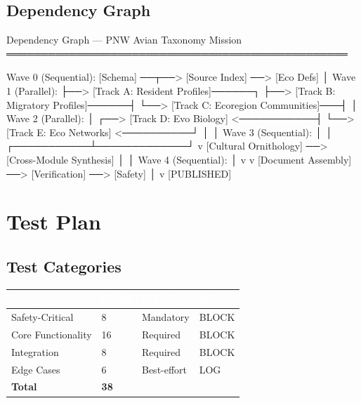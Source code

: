 \documentclass[11pt,letterpaper]{article}
\newcommand{\tableheader}[1]{\textbf{\sffamily\textcolor{white}{#1}}}
\begin{document}
\subsection{Dependency Graph}

\begin{asciibox}
Dependency Graph — PNW Avian Taxonomy Mission
═════════════════════════════════════════════════

Wave 0 (Sequential):
  [Schema] ──┬──> [Source Index] ──> [Eco Defs]
             │
Wave 1 (Parallel):
             ├──> [Track A: Resident Profiles]──────┐
             ├──> [Track B: Migratory Profiles]──────┤
             └──> [Track C: Ecoregion Communities]───┤
                                                     │
Wave 2 (Parallel):                                   │
             ┌──> [Track D: Evo Biology] <───────────┤
             └──> [Track E: Eco Networks] <──────────┘
                         │             │
Wave 3 (Sequential):    │             │
             ┌───────────┴─────────────┘
             v
  [Cultural Ornithology] ──> [Cross-Module Synthesis]
             │                        │
Wave 4 (Sequential):                 │
             v                        v
  [Document Assembly] ──> [Verification] ──> [Safety]
                                              │
                                              v
                                        [PUBLISHED]
\end{asciibox}

\section{Test Plan}

\subsection{Test Categories}

\begin{center}
\begin{tabularx}{\textwidth}{L{3cm}C{1.5cm}C{1.5cm}C{1.5cm}}
\toprule
{}
\tableheader{Category} & \tableheader{Count} & \tableheader{Priority} & \tableheader{Failure} \\
\midrule
Safety-Critical & 8 & Mandatory & BLOCK \\
Core Functionality & 16 & Required & BLOCK \\
Integration & 8 & Required & BLOCK \\
Edge Cases & 6 & Best-effort & LOG \\
\midrule
\textbf{Total} & \textbf{38} & & \\
\bottomrule
\end{tabularx}
\end{center}
\end{document}
